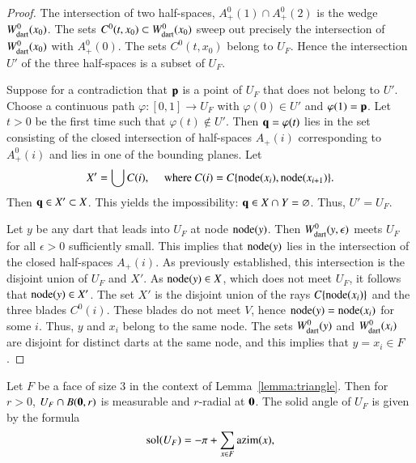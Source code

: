 \begin{proof} The intersection of two half-spaces, $A^0_+(1)\cap
A^0_+(2)$ is the wedge $W^0_{\text{dart}}(x_0)$.  The sets
$C^0(t,x_0)\subset W^0_{\text{dart}}(x_0)$ sweep out precisely the intersection
of $W^0_{\text{dart}}(x_0)$ with $A^0_+(0)$.  The sets $C^0(t,x_0)$ belong to
$U_F$.  Hence the intersection $U'$ of the three half-spaces is a
subset of $U_F$.

Suppose for a contradiction that ${\mathbf p}$ is a point of $U_F$ that does
not belong to $U'$.  Choose a continuous path $\varphi:[0,1]\to U_F$
with $\varphi(0)\in U'$ and $\varphi(1)={\mathbf p}$.  Let $t>0$ be the first
time such that $\varphi(t)\not\in U'$.  Then ${\mathbf q}=\varphi(t)$ lies in
the set consisting of the closed intersection of half-spaces
$A_+(i)$ corresponding to $A^0_+(i)$ and lies in one of the bounding
planes.  Let
\begin{displaymath}
X' = \bigcup C(i),\quad\text{ where } C(i)=C\{{\operatorname{node}}(x_i),{\operatorname{node}}(x_{i+1})\}.
\end{displaymath}
Then ${\mathbf q}\in X'\subset X$.  This yields the impossibility:
${\mathbf q}\in X\cap Y = \varnothing$.   Thus, $U'=U_F$.

Let $y$ be any dart that leads into $U_F$ at node ${\operatorname{node}}(y)$.  Then
$W^0_{\text{dart}}(y,\epsilon)$ meets $U_F$ for all $\epsilon>0$ sufficiently
small.  This implies that ${\operatorname{node}}(y)$ lies in the intersection of the
closed half-spaces $A_+(i)$.  As previously established, this
intersection is the disjoint union of $U_F$ and $X'$.  As ${\operatorname{node}}(y)\in
X$, which does not meet $U_F$, it follows that ${\operatorname{node}}(y)\in X'$.  The set
$X'$ is the disjoint union of the rays $C\{{\operatorname{node}}(x_i)\}$ and the three
blades $C^0(i)$.  These blades do not meet $V$, hence ${\operatorname{node}}(y)={\operatorname{node}}(x_i)$
for some $i$.  Thus, $y$ and $x_i$ belong to the same node.  The sets
$W^0_{\text{dart}}(y)$ and $W^0_{\text{dart}}( x_i)$ are disjoint for distinct darts at the
same node, and this implies that $y=x_i\in F$.
\end{proof}

\begin{corollary}\label{lemma:girard-component}
Let $F$ be a face of size $3$ in the context of
Lemma~\ref{lemma:triangle}.  Then for $r>0$, $U_F \cap B({\mathbf 0},r)$ is
measurable and $r$-radial at ${\mathbf 0}$.  The solid angle of $U_F$ is
given by the formula
\begin{displaymath}
\operatorname{sol}(U_F) = -\pi + \sum_{x\in F}{\operatorname{azim}}(x),
\end{displaymath}
\end{corollary}
%
%
%

